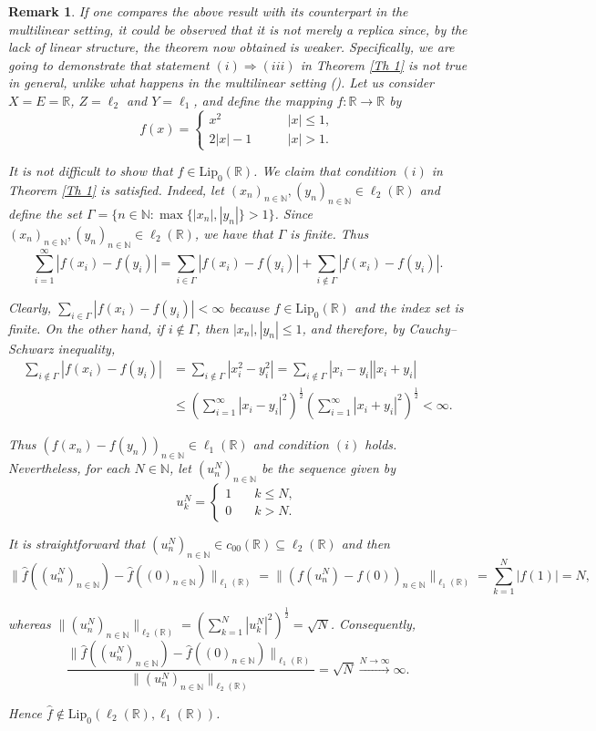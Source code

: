 \documentclass[12pt]{amsart}
\newtheorem{remark}[theorem]{Remark}
\def\R{\mathbb{R}}
\def\N{\mathbb{N}}
\def\Lip{\mathrm{Lip}_0}
\begin{document}
\begin{remark}
	If one compares the above result with its counterpart in the multilinear setting, it could be observed that it is not merely a replica since, by the lack of linear structure, the theorem now obtained is weaker. Specifically, we are going to demonstrate that statement $(i) \Rightarrow (iii)$ in Theorem \ref{Th 1} is not true in general, unlike what happens in the multilinear setting (\cite[Proposition 2.4]{BotCam-17}). Let us consider $X=E=\R$, $Z=\ell_2$ and $Y=\ell_1$, and define the mapping $f:\R \to \R$ by
	$$
	f(x) = \begin{cases}
		x^2 \qquad &|x|\leq 1,\\
		2|x|-1 \qquad &|x| > 1.
	\end{cases}
	$$

	It is not difficult to show that $f \in \Lip(\R)$. We claim that condition $(i)$ in Theorem \ref{Th 1} is satisfied. Indeed, let $(x_n)_{n\in\N},(y_n)_{n\in\N} \in \ell_2(\R)$ and define the set $\Gamma = \{n \in\N: \max\{|x_n|,|y_n|\}>1\}$. Since $(x_n)_{n\in\N},(y_n)_{n\in\N} \in \ell_2(\R)$, we have that $\Gamma$ is finite. Thus
	$$
	\sum_{i=1}^\infty |f(x_i)-f(y_i)| = \sum_{i\in \Gamma} |f(x_i)-f(y_i)| + \sum_{i\notin \Gamma} |f(x_i)-f(y_i)|.
	$$

	Clearly, $\sum_{i\in \Gamma} |f(x_i)-f(y_i)| <\infty$ because $f\in\Lip(\R)$ and the index set is finite. On the other hand, if $i \notin \Gamma$, then $|x_n|,|y_n| \leq 1$, and therefore, by Cauchy--Schwarz inequality,
	\begin{align*}
	\sum_{i\notin \Gamma} |f(x_i)-f(y_i)| &= \sum_{i\notin\Gamma} |x_i^2-y_i^2| = \sum_{i\notin\Gamma}|x_i-y_i||x_i+y_i|\\
	&\leq \left( \sum_{i=1}^{\infty} |x_i-y_i|^2 \right)^{\frac{1}{2}} \left( \sum_{i=1}^{\infty} |x_i+y_i|^2 \right)^{\frac{1}{2}}< \infty.
	\end{align*}

	Thus $(f(x_n)-f(y_n))_{n\in\N} \in \ell_1(\R)$ and condition $(i)$ holds. Nevertheless, for each $N \in \N$, let $(u_n^N)_{n\in\N}$ be the sequence given by
	$$
	u_k^N= 
	\begin{cases}
	1 \quad  & k \leq N,\\
	0 \quad & k > N. 
	\end{cases}
	$$

	It is straightforward that $(u_n^N)_{n\in\N} \in c_{00}(\R) \subseteq \ell_2(\R)$ and then 
	$$
	\|\hat{f}((u_n^N)_{n\in\N})-\hat{f}((0)_{n\in\N})\|_{\ell_1(\R)} = \|(f(u_n^N)-f(0))_{n\in\N}\|_{\ell_1(\R)} = \sum_{k=1}^{N} |f(1)| = N,
	$$

	whereas $\|(u_n^N)_{n\in\N}\|_{\ell_2(\R)} = \left( \sum_{k=1}^{N} |u_k^N|^2 \right)^{\frac{1}{2}} = \sqrt{N}$. Consequently,
	$$
	\frac{\|\hat{f}((u_n^N)_{n\in\N})-\hat{f}((0)_{n\in\N})\|_{\ell_1(\R)}}{\|(u_n^N)_{n\in\N}\|_{\ell_2(\R)}} = \sqrt{N} \xrightarrow{N \to \infty} \infty.
	$$

	Hence $\hat{f} \notin \Lip(\ell_2(\R),\ell_1(\R))$.
\end{remark}
\end{document}
